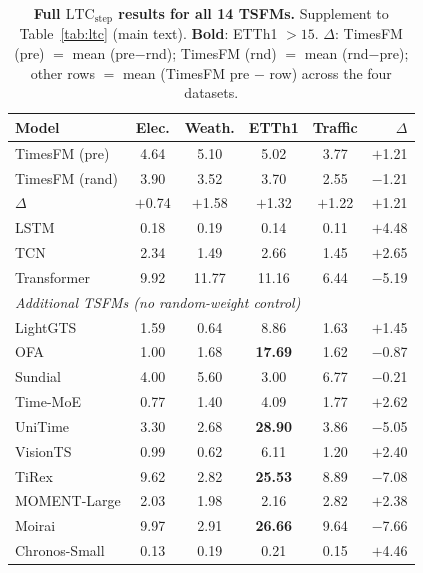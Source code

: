 \documentclass[10pt]{article}
\theoremstyle{definition}
\theoremstyle{remark}
\newcommand{\ltcstep}{\ensuremath{\mathrm{LTC}_{\mathrm{step}}}}
\begin{document}
\begin{table}[h]
\centering
\caption{\textbf{Full $\ltcstep$ results for all 14 TSFMs.}
Supplement to Table~\ref{tab:ltc} (main text). \textbf{Bold}: ETTh1 $>15$.
$\Delta$: TimesFM (pre) $=$ mean (pre$-$rnd); TimesFM (rnd) $=$ mean (rnd$-$pre);
other rows $=$ mean (TimesFM pre $-$ row) across the four datasets.}
\label{tab:ltc_ext}
\small
\setlength{\tabcolsep}{3pt}
\begin{tabular}{lccccr}
\toprule
\textbf{Model} & \textbf{Elec.} & \textbf{Weath.} & \textbf{ETTh1} & \textbf{Traffic} & $\Delta$\\
\midrule
TimesFM (pre)  & 4.64 & 5.10 & 5.02 & 3.77 & $+$1.21\\
TimesFM (rand) & 3.90 & 3.52 & 3.70 & 2.55 & $-$1.21\\
$\Delta$       & $+$0.74 & $+$1.58 & $+$1.32 & $+$1.22 & $+$1.21\\
\midrule
LSTM           & 0.18 & 0.19 & 0.14 & 0.11 & $+$4.48\\
TCN            & 2.34 & 1.49 & 2.66 & 1.45 & $+$2.65\\
Transformer    & 9.92 & 11.77 & 11.16 & 6.44 & $-$5.19\\
\midrule
\multicolumn{6}{l}{\textit{Additional TSFMs (no random-weight control)}}\\
LightGTS      & 1.59 & 0.64 & 8.86  & 1.63 & $+$1.45\\
OFA           & 1.00 & 1.68 & \textbf{17.69} & 1.62 & $-$0.87\\
Sundial       & 4.00 & 5.60 & 3.00  & 6.77 & $-$0.21\\
Time-MoE      & 0.77 & 1.40 & 4.09  & 1.77 & $+$2.62\\
UniTime       & 3.30 & 2.68 & \textbf{28.90} & 3.86 & $-$5.05\\
VisionTS      & 0.99 & 0.62 & 6.11  & 1.20 & $+$2.40\\
TiRex         & 9.62 & 2.82 & \textbf{25.53} & 8.89 & $-$7.08\\
MOMENT-Large  & 2.03 & 1.98 & 2.16  & 2.82 & $+$2.38\\
Moirai        & 9.97 & 2.91 & \textbf{26.66} & 9.64 & $-$7.66\\
Chronos-Small & 0.13 & 0.19 & 0.21  & 0.15 & $+$4.46\\
\bottomrule
\end{tabular}
\end{table}
\end{document}
